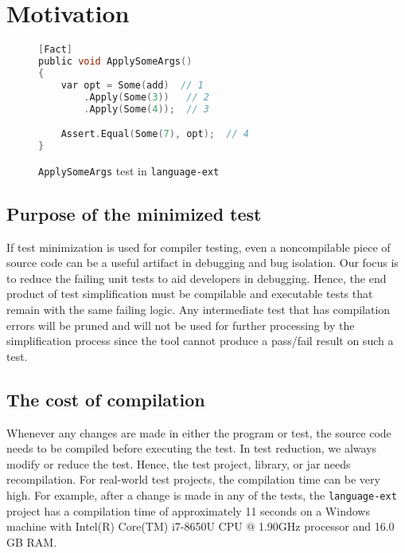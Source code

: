 \clearpage %

\chapter{Motivation}\label{CH3_Motivation}


\begin{figure}
\begin{lstlisting}[language=C, linewidth=0.6\linewidth]
[Fact]
public void ApplySomeArgs()
{
	var opt = Some(add)  // 1
		.Apply(Some(3))   // 2
		.Apply(Some(4));  // 3

	Assert.Equal(Some(7), opt);  // 4
}
\end{lstlisting}

\caption{\texttt{ApplySomeArgs} test in \texttt{language-ext}}
\label{fig:applySomeArgs}
\end{figure}


\section{Purpose of the minimized test}
If test minimization is used for compiler testing, even a noncompilable piece of source code can be a useful artifact in debugging and bug isolation. Our focus is to reduce the failing unit tests to aid developers in debugging. Hence, the end product of test simplification must be compilable and executable tests that remain with the same failing logic. Any intermediate test that has compilation errors will be pruned and will not be used for further processing by the simplification process since the tool cannot produce a pass/fail result on such a test.


\section{The cost of compilation}
Whenever any changes are made in either the program or test, the source code needs to be compiled before executing the test. In test reduction, we always modify or reduce the test. Hence, the test project, library, or jar needs recompilation. For real-world test projects, the compilation time can be very high. For example, after a change is made in any of the tests, the \texttt{language-ext} project has a compilation time of approximately 11 seconds on a Windows machine with Intel(R) Core(TM) i7-8650U CPU @ 1.90GHz processor and 16.0 GB RAM. 


